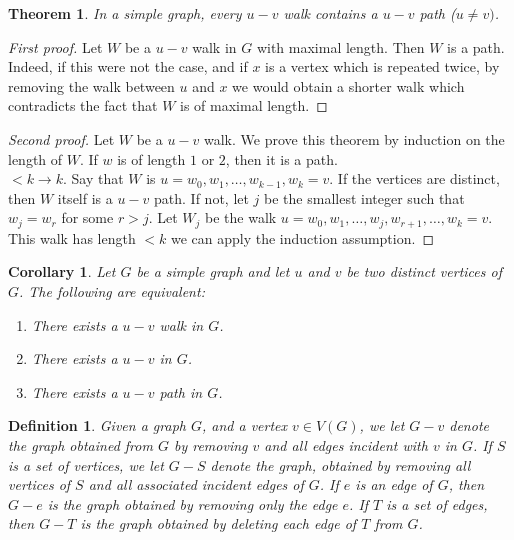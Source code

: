 \documentclass[12pt,a4paper]{article}
\newtheorem{thm}{Theorem}[section]
\newtheorem{cor}{Corollary}[section]
\newtheorem{defn}{Definition}[section]
\theoremstyle{definition}
\begin{document}
\newpage
\begin{thm} In a simple graph, every $u-v$ walk contains a $u-v$ path ($u \neq v)$. 
\end{thm}
\begin{proof}[First proof] Let $W$ be a $u-v$ walk in $G$ with maximal length. Then $W$ is a path. Indeed, if this were not the case, and if $x$ is a vertex which is repeated twice, by removing the walk between $u$ and $x$ we would obtain a shorter walk which contradicts the fact that $W$ is of maximal length. 
\end{proof}
\begin{proof}[Second proof] Let $W$ be a $u-v$ walk. We prove this theorem by induction on the length of $W$. If $w$ is of length $1$ or $2$, then it is a path. \\
$<k \to k$. Say that $W$ is $u = w_0, w_1, \dots , w_{k-1}, w_k = v$. If the vertices are distinct, then $W$ itself is a $u-v$ path. If not, let $j$ be the smallest integer such that $w_j = w_r$ for some $r>j$. Let $W_j$ be the walk $u = w_0, w_1, \dots , w_j , w_{r+1}, \dots , w_k = v$. This walk has length $<k$ we can apply the induction assumption.

\end{proof}
\begin{cor} Let $G$ be a simple graph and let $u$ and $v$ be two distinct vertices of $G$. The following are equivalent:
\begin{enumerate}
\item There exists a $u-v$ walk in $G$.
\item There exists a $u-v$ in $G$.
\item There exists a $u-v$ path in $G$.  
\end{enumerate}
\end{cor}
\newpage
\begin{defn}
Given a graph $G$, and a vertex $v \in V(G)$, we let $G-v$ denote the graph obtained from $G$ by removing $v$ and all edges incident with $v$ in $G$.  If $S$ is a set of vertices, we let $G-S$ denote the graph, obtained by removing all vertices of $S$ and all associated incident edges of $G$. If $e$ is an edge of $G$, then $G-e$ is the graph obtained by removing only the edge $e$. If $T$ is a set of edges, then $G-T$ is the graph obtained by deleting each edge of $T$ from $G$. 
\end{defn}
\end{document}
